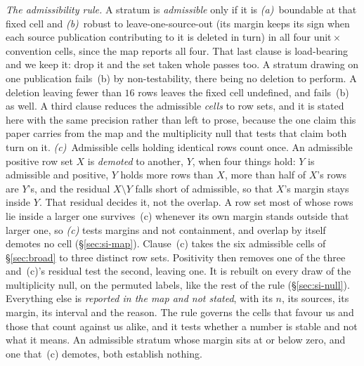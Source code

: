 \emph{The admissibility rule.} A stratum is \emph{admissible} only if it is \emph{(a)}~boundable at
that fixed cell and \emph{(b)}~robust to leave-one-source-out (its margin keeps its sign when each
source publication contributing to it is deleted in turn) in all four unit\,$\times$\,convention
cells, since the map reports all four. That last clause is load-bearing and we keep it: drop it and
the set taken whole passes too. A stratum drawing on one publication fails~(b) by
non-testability, there being no deletion to perform. A deletion leaving fewer than $16$ rows leaves
the fixed cell undefined, and fails~(b) as well. A third clause reduces the admissible \emph{cells}
to row sets, and it is stated here with the same precision rather than left to prose, because the
one claim this paper carries from the map and the multiplicity null that tests that claim both turn
on it. \emph{(c)}~Admissible cells holding identical rows count once. An admissible positive row
set $X$ is \emph{demoted} to another, $Y$, when four things hold: $Y$ is admissible and positive,
$Y$ holds more rows than $X$, more than half of $X$'s rows are $Y$'s, and the residual $X\setminus Y$
falls short of admissible, so that $X$'s margin stays inside $Y$. That residual decides it, not
the overlap. A row set most of whose rows lie inside a larger one survives~(c) whenever its own
margin stands outside that larger one, so \emph{(c)} tests margins and not containment, and
overlap by itself demotes no cell (\S\ref{sec:si-map}).
Clause~(c) takes the six admissible cells of \S\ref{sec:broad} to three distinct row sets.
Positivity then removes one of the three and~(c)'s residual test the second, leaving one. It is
rebuilt on every draw of the multiplicity null, on the permuted labels, like the rest of the rule
(\S\ref{sec:si-null}). Everything else is \emph{reported in the map and not
stated}, with its $n$, its sources, its margin, its interval and the reason. The rule governs the
cells that favour us and those that count against us alike, and it tests whether a number is stable
and not what it means. An admissible stratum whose margin sits at or below zero, and one
that~(c) demotes, both establish nothing.


